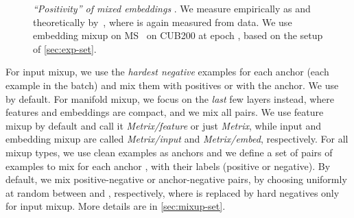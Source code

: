 \documentclass{article}
\makeatletter
\newcommand{\leg}[1]{\addlegendentry{#1}}
\renewcommand\paragraph{\@startsection{paragraph}{4}{\z@}{1ex}{-1em}{\normalfont\normalsize\bfseries}}
\makeatother
\begin{document}
\begin{wrapfigure}{r}{7cm}
\centering
\vspace{-20pt}
\vspace{-6pt}
\caption{\emph{``Positivity'' of mixed embeddings \vs }. We measure  empirically as  and theoretically by~, where  is again measured from data. We use embedding mixup on MS~ on CUB200 at epoch , based on the setup of \autoref{sec:exp-set}.}
\vspace{-6pt}
\label{fig:gradient-plot}
\end{wrapfigure}



\paragraph{Mixup settings}

For input mixup, we use the  \emph{hardest negative} examples for each anchor (each example in the batch) and mix them with positives or with the anchor. We use  by default. For manifold mixup, we focus on the \emph{last} few layers instead, where features and embeddings are compact, and we mix all pairs. We use feature mixup by default and call it \emph{Metrix/feature} or just \emph{Metrix}, while input and embedding mixup are called \emph{Metrix/input} and \emph{Metrix/embed}, respectively. For all mixup types, we use clean examples as anchors and we define a set  of pairs of examples to mix for each anchor , with their labels (positive or negative). By default, we mix positive-negative or anchor-negative pairs, by choosing uniformly at random between  and ,
respectively, where  is replaced by hard negatives only for input mixup. More details are in \autoref{sec:mixup-set}.
\end{document}
